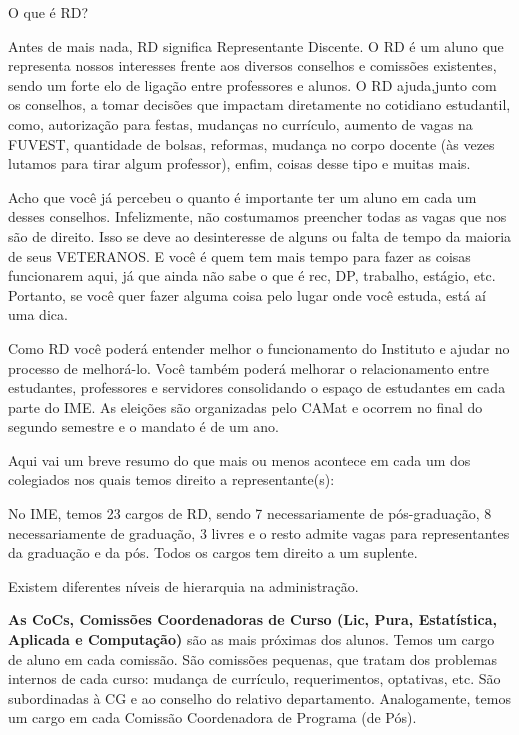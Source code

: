 \begin{secao}{O que é RD?}

Antes de mais nada, RD significa Representante Discente. O RD é um aluno que 
representa nossos interesses frente aos diversos conselhos e comissões existentes, 
sendo um forte elo de ligação entre professores e alunos. O RD ajuda,junto com 
os conselhos, a tomar decisões que impactam diretamente no cotidiano estudantil, 
como, autorização para festas, mudanças no currículo, aumento de vagas na FUVEST, 
quantidade de bolsas, reformas, mudança no corpo docente (às vezes 
lutamos para tirar algum professor), enfim, coisas desse tipo e muitas mais.

Acho que você já percebeu o quanto é importante ter um aluno em cada um desses
conselhos. Infelizmente, não costumamos preencher todas as vagas que nos são de
direito. Isso se deve ao desinteresse de alguns ou falta de tempo da maioria
de seus VETERANOS. E você é quem tem mais tempo para fazer as coisas
funcionarem aqui, já que ainda não sabe o que é rec, DP, trabalho, estágio, etc.
Portanto, se você quer fazer alguma coisa pelo lugar onde você estuda, está aí
uma dica.

Como RD você poderá entender melhor o funcionamento do Instituto e ajudar no 
processo de melhorá-lo. Você também poderá melhorar o relacionamento entre 
estudantes, professores e servidores consolidando o espaço de estudantes em 
cada parte do IME. As eleições são organizadas pelo CAMat e ocorrem no final 
do segundo semestre e o mandato é de um ano.

Aqui vai um breve resumo do que mais ou menos acontece em cada um dos colegiados 
nos quais temos direito a representante(s):

No IME, temos 23 cargos de RD, sendo 7 necessariamente de pós-graduação, 8
necessariamente de graduação, 3 livres e o resto admite vagas para representantes 
da graduação e da pós. Todos os cargos tem direito a um suplente.

Existem diferentes níveis de hierarquia na administração.

{\bf As CoCs,
Comissões Coordenadoras de Curso (Lic, Pura, Estatística, Aplicada e
Computação)} são as mais próximas dos alunos. Temos um cargo de aluno em cada
comissão. São comissões pequenas, que tratam dos problemas internos de cada
curso: mudança de currículo, requerimentos, optativas, etc. São subordinadas 
à CG e ao conselho do relativo departamento. Analogamente, temos um cargo em cada
Comissão Coordenadora de Programa (de Pós).


\end{secao}
